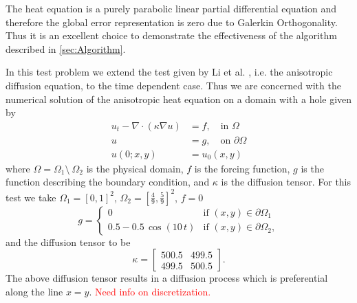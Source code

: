 \begin{test} \label{tst:Heat}
  The heat equation is a purely parabolic linear partial differential equation
  and therefore the global error representation is zero due to Galerkin
  Orthogonality.  Thus it is an excellent choice to demonstrate the
  effectiveness of the algorithm described in \autoref{sec:Algorithm}.

  In this test problem we extend the test given by Li et al.
  \cite[Example 5.1]{Li2010}, i.e. the anisotropic diffusion equation, to the
  time dependent case. Thus we are concerned with the numerical solution of the
  anisotropic heat equation on a domain with a hole given by
  \begin{equation} \label{eq:Heat}
    \begin{split}
      u_t - \nabla \cdot (\kappa \nabla u) &= f, \quad \text{in } \Omega \\
      u &= g, \quad \text{on } \partial \Omega \\
      u(0;x,y) &= u_0(x,y)
    \end{split}
  \end{equation}
  where $\Omega = \Omega_1\setminus~\Omega_2$ is the physical domain, $f$ is the
  forcing function, $g$ is the function describing the boundary condition, and
  $\kappa$ is the diffusion tensor. For this test we take $\Omega_1 = [0,
  1]^2$, $\Omega_2 = [\frac{4}{9}, \frac{5}{9}]^2$, $f = 0$
  \begin{equation}
    g = \begin{cases}
        0 & \text{if } (x,y) \in \partial \Omega_1 \\
        0.5 - 0.5\, \cos(10\, t) & \text{if } (x,y) \in \partial \Omega_2,
    \end{cases}
    \label{eqn:BCFunction}
  \end{equation}
  and the diffusion tensor to be
  \begin{equation}
    \kappa = \begin{bmatrix} 500.5 & 499.5 \\ 499.5 & 500.5 \end{bmatrix}.
    \label{eqn:DiffusionTensor}
  \end{equation}
  The above diffusion tensor results in a diffusion process which is
  preferential along the line $x = y$.
  \textcolor{red}{Need info on discretization.}
\end{test}

